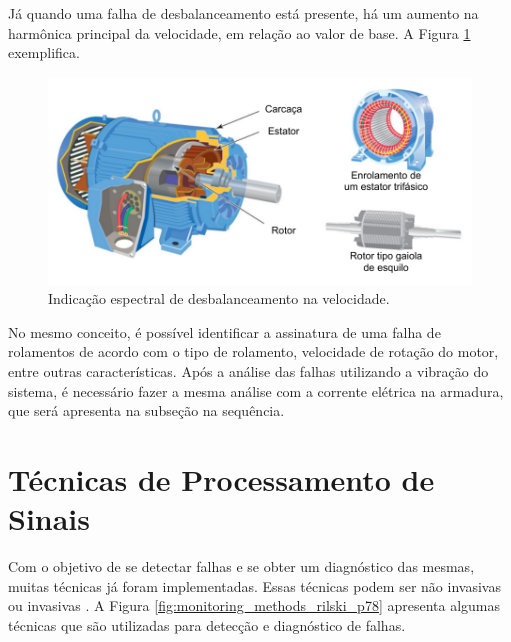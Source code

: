 Já quando uma falha de desbalanceamento está presente, há um aumento na harmônica principal da velocidade, em relação ao valor de base.
A Figura \ref{fig:imbalance_analog_p2} exemplifica.

\begin{figure}[H]
    \caption{Indicação espectral de desbalanceamento na velocidade.}
    \begin{center}
        \includegraphics[scale=0.8, page=7]{referencial/img/imagens_referencial.pdf}
    \end{center}
    \label{fig:imbalance_analog_p2}
\end{figure}

No mesmo conceito, é possível identificar a assinatura de uma falha de rolamentos de acordo com o tipo de rolamento, velocidade de rotação
do motor, entre outras características. Após a análise das falhas utilizando a vibração do sistema, é necessário fazer a mesma análise com a corrente elétrica na armadura, 
que será apresenta na subseção na sequência.



% 

\section{Técnicas de Processamento de Sinais}\label{sec:signal_process}

Com o objetivo de se detectar falhas e se obter um diagnóstico das mesmas, muitas técnicas já foram implementadas. Essas técnicas podem ser
não invasivas ou invasivas \cite{Gorbounov2018}. A Figura \ref{fig:monitoring_methods_rilski_p78} apresenta algumas técnicas que são
utilizadas para detecção e diagnóstico de falhas.

